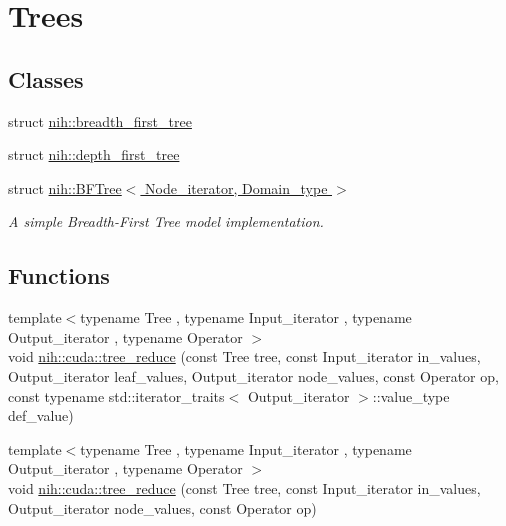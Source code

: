 \hypertarget{group__trees}{
\section{\-Trees}
\label{group__trees}
}
\subsection*{\-Classes}
\begin{DoxyCompactItemize}
\item 
struct \hyperlink{structnih_1_1breadth__first__tree}{nih\-::breadth\-\_\-first\-\_\-tree}
\item 
struct \hyperlink{structnih_1_1depth__first__tree}{nih\-::depth\-\_\-first\-\_\-tree}
\item 
struct \hyperlink{structnih_1_1_b_f_tree}{nih\-::\-B\-F\-Tree$<$ Node\-\_\-iterator, Domain\-\_\-type $>$}
\begin{DoxyCompactList}\small\item\em \-A simple \-Breadth-\/\-First \-Tree model implementation. \end{DoxyCompactList}\end{DoxyCompactItemize}
\subsection*{\-Functions}
\begin{DoxyCompactItemize}
\item 
{\footnotesize template$<$typename Tree , typename Input\-\_\-iterator , typename Output\-\_\-iterator , typename Operator $>$ }\\void \hyperlink{group__trees_gaa9d77543c5662fa5fc19d34fbcffece1}{nih\-::cuda\-::tree\-\_\-reduce} (const \-Tree tree, const \-Input\-\_\-iterator in\-\_\-values, \-Output\-\_\-iterator leaf\-\_\-values, \-Output\-\_\-iterator node\-\_\-values, const \-Operator op, const typename std\-::iterator\-\_\-traits$<$ \-Output\-\_\-iterator $>$\-::value\-\_\-type def\-\_\-value)
\item 
{\footnotesize template$<$typename Tree , typename Input\-\_\-iterator , typename Output\-\_\-iterator , typename Operator $>$ }\\void \hyperlink{group__trees_ga623ca32c63710202fea743670faeee28}{nih\-::cuda\-::tree\-\_\-reduce} (const \-Tree tree, const \-Input\-\_\-iterator in\-\_\-values, \-Output\-\_\-iterator node\-\_\-values, const \-Operator op)
\end{DoxyCompactItemize}


